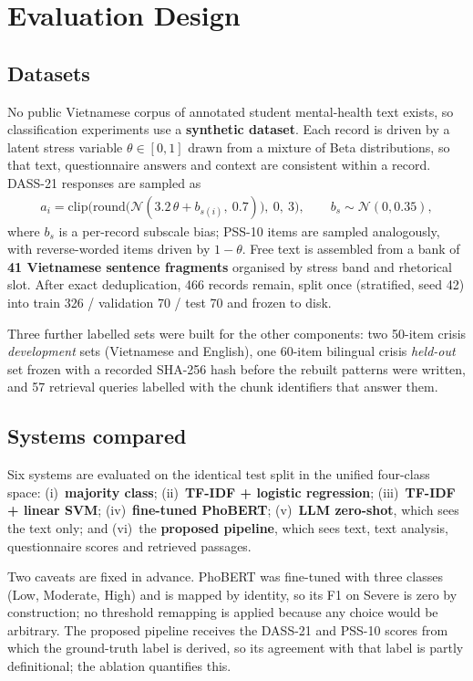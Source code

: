 \section{Evaluation Design}
\label{sec:eval-design}

\subsection{Datasets}
No public Vietnamese corpus of annotated student mental-health text exists, so classification experiments use a \textbf{synthetic dataset}. Each record is driven by a latent stress variable $\theta\in[0,1]$ drawn from a mixture of Beta distributions, so that text, questionnaire answers and context are consistent within a record. DASS-21 responses are sampled as
\begin{align}
	a_i = \mathrm{clip}\Big(\mathrm{round}\big(\mathcal{N}(3.2\,\theta + b_{s(i)},\ 0.7)\big),\ 0,\ 3\Big), \qquad b_s \sim \mathcal{N}(0, 0.35), \label{eq:gen}
\end{align}
where $b_s$ is a per-record subscale bias; PSS-10 items are sampled analogously, with reverse-worded items driven by $1-\theta$. Free text is assembled from a bank of \textbf{41 Vietnamese sentence fragments} organised by stress band and rhetorical slot. After exact deduplication, 466 records remain, split once (stratified, seed 42) into train 326 / validation 70 / test 70 and frozen to disk.

Three further labelled sets were built for the other components: two 50-item crisis \textit{development} sets (Vietnamese and English), one 60-item bilingual crisis \textit{held-out} set frozen with a recorded SHA-256 hash before the rebuilt patterns were written, and 57 retrieval queries labelled with the chunk identifiers that answer them.

\subsection{Systems compared}
Six systems are evaluated on the identical test split in the unified four-class space: (i)~\textbf{majority class}; (ii)~\textbf{TF-IDF + logistic regression}; (iii)~\textbf{TF-IDF + linear SVM}; (iv)~\textbf{fine-tuned PhoBERT}; (v)~\textbf{LLM zero-shot}, which sees the text only; and (vi)~the \textbf{proposed pipeline}, which sees text, text analysis, questionnaire scores and retrieved passages.

Two caveats are fixed in advance. PhoBERT was fine-tuned with three classes (Low, Moderate, High) and is mapped by identity, so its F1 on Severe is zero by construction; no threshold remapping is applied because any choice would be arbitrary. The proposed pipeline receives the DASS-21 and PSS-10 scores from which the ground-truth label is derived, so its agreement with that label is partly definitional; the  ablation quantifies this.


